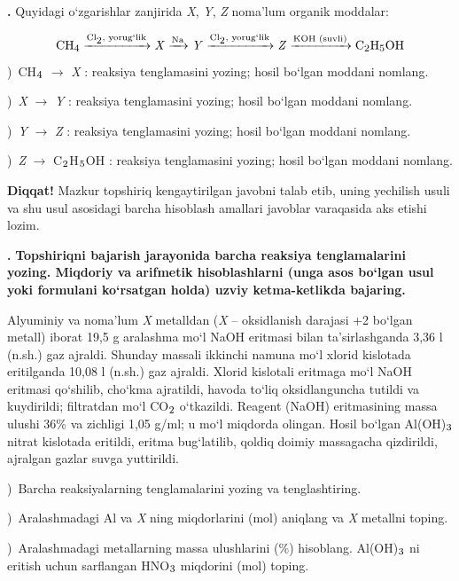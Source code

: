 \documentclass[11pt,a4paper]{article}
\renewcommand{\textsubscript}[1]{\ensuremath{_{\text{\fontsize{8}{8}\selectfont #1}}}}
\newcommand{\qn}[1]{\textbf{\fontsize{11.5}{13}\selectfont #1}}
\newcommand{\qsep}{\par\vspace{13pt}}
\newcommand{\diqqat}[1]{\par\smallskip\noindent\textbf{Diqqat!} #1\par\medskip}
\begin{document}
\noindent\qn{42.} Quyidagi o`zgarishlar zanjirida \textit{X}, \textit{Y}, \textit{Z} noma'lum organik moddalar:\par
\[\setlength{\fboxsep}{0pt}\text{CH\textsubscript{4}}\xrightarrow{\text{Cl\textsubscript{2}, yorug`lik}}\text{\textit{X}}\xrightarrow{\text{Na}}\text{\textit{Y}}\xrightarrow{\text{Cl\textsubscript{2}, yorug`lik}}\text{\textit{Z}}\xrightarrow{\text{KOH (suvli)}}\text{C\textsubscript{2}H\textsubscript{5}OH}\]
)\ CH\textsubscript{4} $\to$ \textit{X} : reaksiya tenglamasini yozing; hosil bo`lgan moddani nomlang.\par
{})\ \textit{X} $\to$ \textit{Y} : reaksiya tenglamasini yozing; hosil bo`lgan moddani nomlang.\par
{})\ \textit{Y} $\to$ \textit{Z} : reaksiya tenglamasini yozing; hosil bo`lgan moddani nomlang.\par
{})\ \textit{Z} $\to$ C\textsubscript{2}H\textsubscript{5}OH : reaksiya tenglamasini yozing; hosil bo`lgan moddani nomlang.\par
\diqqat{Mazkur topshiriq kengaytirilgan javobni talab etib, uning yechilish usuli va shu usul asosidagi barcha hisoblash amallari javoblar varaqasida aks etishi lozim.}\qsep
\noindent\qn{43.} \textbf{Topshiriqni bajarish jarayonida barcha reaksiya tenglamalarini yozing. Miqdoriy va arifmetik hisoblashlarni (unga asos bo`lgan usul yoki formulani ko`rsatgan holda) uzviy ketma-ketlikda bajaring.}\par\smallskip
Alyuminiy va noma'lum \textit{X} metalldan (\textit{X} -- oksidlanish darajasi +2 bo`lgan metall) iborat 19,5 g aralashma mo`l NaOH eritmasi bilan ta'sirlashganda 3,36 l (n.sh.) gaz ajraldi. Shunday massali ikkinchi namuna mo`l xlorid kislotada eritilganda 10,08 l (n.sh.) gaz ajraldi. Xlorid kislotali eritmaga mo`l NaOH eritmasi qo`shilib, cho`kma ajratildi, havoda to`liq oksidlanguncha tutildi va kuydirildi; filtratdan mo`l CO\textsubscript{2} o`tkazildi. Reagent (NaOH) eritmasining massa ulushi 36\% va zichligi 1,05 g/ml; u mo`l miqdorda olingan. Hosil bo`lgan Al(OH)\textsubscript{3} nitrat kislotada eritildi, eritma bug`latilib, qoldiq doimiy massagacha qizdirildi, ajralgan gazlar suvga yuttirildi.\par
{})\ Barcha reaksiyalarning tenglamalarini yozing va tenglashtiring.\par
{})\ Aralashmadagi Al va \textit{X} ning miqdorlarini (mol) aniqlang va \textit{X} metallni toping.\par
{})\ Aralashmadagi metallarning massa ulushlarini (\%) hisoblang. Al(OH)\textsubscript{3} ni eritish uchun sarflangan HNO\textsubscript{3} miqdorini (mol) toping.\par
\end{document}
